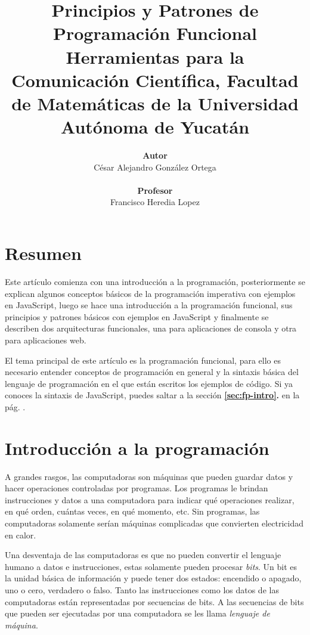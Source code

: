 \documentclass{article}
\begin{document}
\title{\Large{\textbf{Principios y Patrones de Programación Funcional}}\\
  \bigskip\normalsize{Herramientas para la Comunicación Científica, Facultad de Matemáticas de la Universidad Autónoma de Yucatán \medskip}}
\author{
  \textbf{Autor}\\César Alejandro González Ortega\\
  \medskip\\ \textbf{Profesor}\\Francisco Heredia Lopez\\ \medskip
}

\maketitle


\pagebreak
\section*{Resumen}
Este artículo comienza con una introducción a la programación, posteriormente se explican algunos conceptos básicos de la programación imperativa con ejemplos en JavaScript, luego se hace una introducción a la programación funcional, sus principios y patrones básicos con ejemplos en JavaScript y finalmente se describen dos arquitecturas funcionales, una para aplicaciones de consola y otra para aplicaciones web.

El tema principal de este artículo es la programación funcional, para ello es necesario entender conceptos de programación en general y la sintaxis básica del lenguaje de programación en el que están escritos los ejemplos de código. Si ya conoces la sintaxis de JavaScript, puedes saltar a la sección \textbf{\ref{sec:fp-intro}. } en la pág. \pageref{sec:fp-intro}.

\section{Introducción a la programación}
A grandes rasgos, las computadoras son máquinas que pueden guardar datos y hacer operaciones controladas por programas. Los programas le brindan instrucciones y datos a una computadora para indicar qué operaciones realizar, en qué orden, cuántas veces, en qué momento, etc. Sin programas, las computadoras solamente serían máquinas complicadas que convierten electricidad en calor.

Una desventaja de las computadoras es que no pueden convertir el lenguaje humano a datos e instrucciones, estas solamente pueden procesar \textit{bits}. Un bit es la unidad básica de información y puede tener dos estados: encendido o apagado, uno o cero, verdadero o falso. Tanto las instrucciones como los datos de las computadoras están representadas por secuencias de bits. A las secuencias de bits que pueden ser ejecutadas por una computadora se les llama \textit{lenguaje de máquina}.
\end{document}
